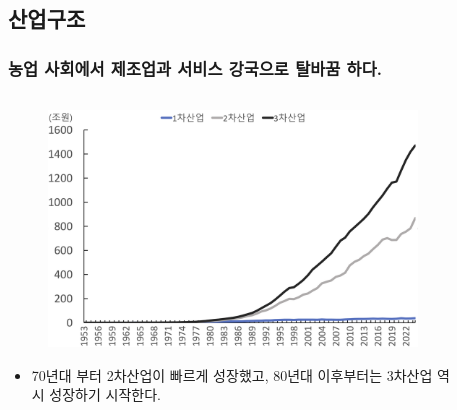 \documentclass[aspectratio=169,xcolor=dvipsnames,handout]{beamer}
\begin{document}
\subsection{산업구조}
\begin{frame}
\frametitle{농업 사회에서 제조업과 서비스 강국으로 탈바꿈 하다.}
\begin{columns}
    \begin{column}{.5\textwidth}
        \begin{figure}
            \centering
            \includegraphics[width=.8\textwidth]{pic/fig_econ_03.png}
        \end{figure}
        \begin{itemize}[<+->]
            \item 70년대 부터 2차산업이 빠르게 성장했고, 80년대 이후부터는 3차산업 역시 성장하기 시작한다.
        \end{itemize}
    \end{column}
    \begin{column}{.5\textwidth}
        \begin{figure}
            \centering

\end{figure}
\end{column}
\end{columns}
\end{frame}
\end{document}
